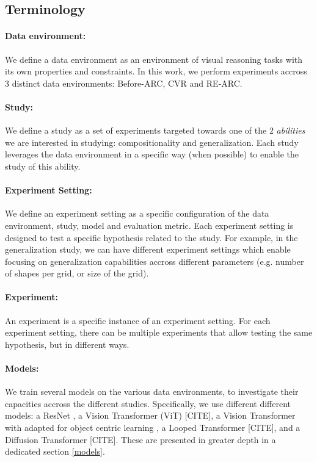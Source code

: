 \subsection{Terminology}

\paragraph{Data environment:} We define a data environment as an environment of visual reasoning tasks with its own properties and constraints. In this work, we perform experiments accross 3 distinct data environments: Before-ARC, CVR and RE-ARC.

\paragraph{Study:} We define a study as a set of experiments targeted towards one of the 2 \textit{abilities} we are interested in studying: compositionality and generalization. Each study leverages the data environment in a specific way (when possible) to enable the study of this ability. 

\paragraph{Experiment Setting:} We define an experiment setting as a specific configuration of the data environment, study, model and evaluation metric. Each experiment setting is designed to test a specific hypothesis related to the study. For example, in the generalization study, we can have different experiment settings which enable focusing on generalization capabilities accross different parameters (e.g. number of shapes per grid, or size of the grid). 

\paragraph{Experiment:} An experiment is a specific instance of an experiment setting. For each experiment setting, there can be multiple experiments that allow testing the same hypothesis, but in different ways. 

\paragraph{Models:} We train several models on the various data environments, to investigate their capacities accross the different studies. Specifically, we use different different models: a ResNet \cite{resnet}, a Vision Transformer (ViT) [CITE], a Vision Transformer with adapted for object centric learning \cite{arc_vit}, a Looped Transformer [CITE], and a Diffusion Transformer [CITE]. These are presented in greater depth in a dedicated section \ref{models}.